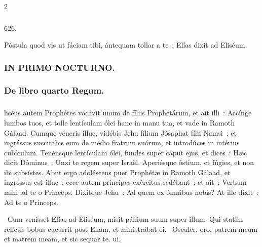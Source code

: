 \documentclass[9pt,twoside]{extarticle}
\begin{document}
\begin{multicols}{2}
\subsubsection*{\center {}}

\begin{tightlist}{}
\item {} 626. 
\item {} Póstula quod vis ut fáciam tibi, ántequam tollar a te~: Elías dixit ad Eliséum. 
\item {}
\item {}
\end{tightlist}

\subsubsection*{\center \textsc{IN PRIMO NOCTURNO.}}
\subsubsection*{\center De libro quarto Regum.}
\subsubsection*{\center {}}
liséus autem Prophétes vocávit unum de fíliis Prophetárum, et ait illi~: Accínge lumbos tuos, et tolle lentículam ólei hanc in manu tua, et vade in Ramoth Gálaad.
Cumque véneris illuc, vidébis Jehu fílium Jósaphat fílii Namsi~: et ingréssus suscitábis eum de médio fratrum suórum, et introdúces in intérius cubículum.
Tenénsque lentículam ólei, fundes super caput ejus, et dices~: Hæc dicit Dóminus~: Unxi te regem super Israël. Aperiésque óstium, et fúgies, et non ibi subsístes.
Abiit ergo adoléscens puer Prophétæ in Ramoth Gálaad,
et ingréssus est illuc~: ecce autem príncipes exércitus sedébant~: et ait~: Verbum mihi ad te o Princeps. Dixítque Jehu~: Ad quem ex ómnibus nobis? At ille dixit~: Ad te o Princeps.

\begin{tightlist}{}
\item {}~Cum venísset Elías ad Eliséum, misit pállium suum super illum. \textred{*} Qui statim relíctis bobus cucúrrit post Elíam, et ministrábat ei. ~Osculer, oro, patrem meum et matrem meam, et sic sequar te. ui.
\end{tightlist}


\end{multicols}
\end{document}
